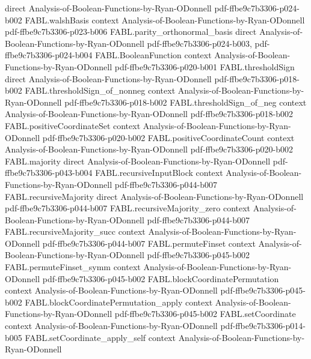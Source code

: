 \begin{theorem}
  {direct}
  {Analysis-of-Boolean-Functions-by-Ryan-ODonnell}
  {pdf-ffbe9c7b3306-p024-b002}
\proofstep
  {FABL.walshBasis}
  {context}
  {Analysis-of-Boolean-Functions-by-Ryan-ODonnell}
  {pdf-ffbe9c7b3306-p023-b006}
\proofstep
  {FABL.parity_orthonormal_basis}
  {direct}
  {Analysis-of-Boolean-Functions-by-Ryan-ODonnell}
  {pdf-ffbe9c7b3306-p024-b003,
    pdf-ffbe9c7b3306-p024-b004}
\proofstep
  {FABL.BooleanFunction}
  {context}
  {Analysis-of-Boolean-Functions-by-Ryan-ODonnell}
  {pdf-ffbe9c7b3306-p020-b001}
\proofstep
  {FABL.thresholdSign}
  {direct}
  {Analysis-of-Boolean-Functions-by-Ryan-ODonnell}
  {pdf-ffbe9c7b3306-p018-b002}
\proofstep
  {FABL.thresholdSign_of_nonneg}
  {context}
  {Analysis-of-Boolean-Functions-by-Ryan-ODonnell}
  {pdf-ffbe9c7b3306-p018-b002}
\proofstep
  {FABL.thresholdSign_of_neg}
  {context}
  {Analysis-of-Boolean-Functions-by-Ryan-ODonnell}
  {pdf-ffbe9c7b3306-p018-b002}
\proofstep
  {FABL.positiveCoordinateSet}
  {context}
  {Analysis-of-Boolean-Functions-by-Ryan-ODonnell}
  {pdf-ffbe9c7b3306-p020-b002}
\proofstep
  {FABL.positiveCoordinateCount}
  {context}
  {Analysis-of-Boolean-Functions-by-Ryan-ODonnell}
  {pdf-ffbe9c7b3306-p020-b002}
\proofstep
  {FABL.majority}
  {direct}
  {Analysis-of-Boolean-Functions-by-Ryan-ODonnell}
  {pdf-ffbe9c7b3306-p043-b004}
\proofstep
  {FABL.recursiveInputBlock}
  {context}
  {Analysis-of-Boolean-Functions-by-Ryan-ODonnell}
  {pdf-ffbe9c7b3306-p044-b007}
\proofstep
  {FABL.recursiveMajority}
  {direct}
  {Analysis-of-Boolean-Functions-by-Ryan-ODonnell}
  {pdf-ffbe9c7b3306-p044-b007}
\proofstep
  {FABL.recursiveMajority_zero}
  {context}
  {Analysis-of-Boolean-Functions-by-Ryan-ODonnell}
  {pdf-ffbe9c7b3306-p044-b007}
\proofstep
  {FABL.recursiveMajority_succ}
  {context}
  {Analysis-of-Boolean-Functions-by-Ryan-ODonnell}
  {pdf-ffbe9c7b3306-p044-b007}
\proofstep
  {FABL.permuteFinset}
  {context}
  {Analysis-of-Boolean-Functions-by-Ryan-ODonnell}
  {pdf-ffbe9c7b3306-p045-b002}
\proofstep
  {FABL.permuteFinset_symm}
  {context}
  {Analysis-of-Boolean-Functions-by-Ryan-ODonnell}
  {pdf-ffbe9c7b3306-p045-b002}
\proofstep
  {FABL.blockCoordinatePermutation}
  {context}
  {Analysis-of-Boolean-Functions-by-Ryan-ODonnell}
  {pdf-ffbe9c7b3306-p045-b002}
\proofstep
  {FABL.blockCoordinatePermutation_apply}
  {context}
  {Analysis-of-Boolean-Functions-by-Ryan-ODonnell}
  {pdf-ffbe9c7b3306-p045-b002}
\proofstep
  {FABL.setCoordinate}
  {context}
  {Analysis-of-Boolean-Functions-by-Ryan-ODonnell}
  {pdf-ffbe9c7b3306-p014-b005}
\proofstep
  {FABL.setCoordinate_apply_self}
  {context}
  {Analysis-of-Boolean-Functions-by-Ryan-ODonnell}

\end{theorem}
